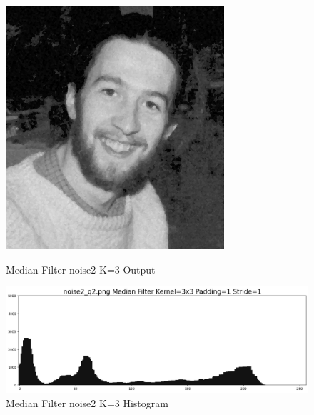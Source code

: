\documentclass[12pt,a4paper]{report}
\begin{document}
\begin{figure}[!htb]
  \includegraphics[width=1\linewidth]{output/noise2_q2_K3P1.png}
  \caption{Median Filter noise2 K=3 Output}
  \includegraphics[width=1\linewidth]{output/noise2_q2_K3P1_his.png}
  \caption{Median Filter noise2 K=3 Histogram}
\end{figure}
\end{document}
